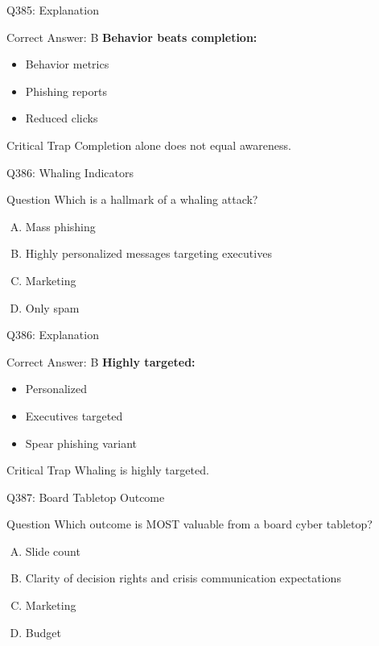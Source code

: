 \documentclass{beamer}
\begin{document}
	\begin{frame}{Q385: Explanation}
		\begin{block}{Correct Answer: B}
			\textbf{Behavior beats completion:}
			\begin{itemize}
				\item Behavior metrics
				\item Phishing reports
				\item Reduced clicks
			\end{itemize}
		\end{block}
		\begin{alertblock}{Critical Trap}
			Completion alone does not equal awareness.
		\end{alertblock}
	\end{frame}
	
	\begin{frame}{Q386: Whaling Indicators}
		\begin{block}{Question}
			Which is a hallmark of a whaling attack?
		\end{block}
		\begin{enumerate}[(A)]
			\item Mass phishing
			\item Highly personalized messages targeting executives
			\item Marketing
			\item Only spam
		\end{enumerate}
	\end{frame}
	
	\begin{frame}{Q386: Explanation}
		\begin{block}{Correct Answer: B}
			\textbf{Highly targeted:}
			\begin{itemize}
				\item Personalized
				\item Executives targeted
				\item Spear phishing variant
			\end{itemize}
		\end{block}
		\begin{alertblock}{Critical Trap}
			Whaling is highly targeted.
		\end{alertblock}
	\end{frame}
	
	\begin{frame}{Q387: Board Tabletop Outcome}
		\begin{block}{Question}
			Which outcome is MOST valuable from a board cyber tabletop?
		\end{block}
		\begin{enumerate}[(A)]
			\item Slide count
			\item Clarity of decision rights and crisis communication expectations
			\item Marketing
			\item Budget
		\end{enumerate}
	\end{frame}
	
\end{document}
